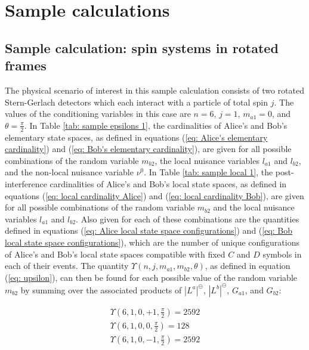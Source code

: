 \documentclass{article}
\begin{document}
\section{Sample calculations \label{sec: Sample calculations}}
\subsection{Sample calculation: spin systems in rotated frames \label{sec: sample rotated}}

The physical scenario of interest in this sample calculation consists of two rotated Stern-Gerlach detectors which each interact with a particle of total spin $j$. The values of the conditioning variables in this case are $n=6$, $j=1$, $m_{a1}=0$, and $\theta=\frac{\pi}{2}$. In Table \ref{tab: sample epsilons 1}, the cardinalities of Alice's and Bob's elementary state spaces, as defined in equations (\ref{eq: Alice's elementary cardinality}) and (\ref{eq: Bob's elementary cardinality}), are given for all possible combinations of the random variable $m_{b2}$, the local nuisance variables $l_{a1}$ and $l_{b2}$, and the non-local nuisance variable $\nu^0$. In Table \ref{tab: sample local 1}, the post-interference cardinalities of Alice's and Bob's local state spaces, as defined in equations (\ref{eq: local cardinality Alice}) and (\ref{eq: local cardinality Bob}), are given for all possible combinations of the random variable $m_{b2}$ and the local nuisance variables $l_{a1}$ and $l_{b2}$. Also given for each of these combinations are the quantities defined in equations (\ref{eq: Alice local state space configurations}) and (\ref{eq: Bob local state space configurations}), which are the number of unique configurations of Alice's and Bob's local state spaces compatible with fixed $C$ and $D$ symbols in each of their events. The quantity $\Upsilon(n,j,m_{a1},m_{b2},\theta)$, as defined in equation (\ref{eq: upsilon}), can then be found for each possible value of the random variable $m_{b2}$ by summing over the associated products of $|L^a|^\circleddash$, $|L^b|^\circleddash$, $G_{a1}$, and $G_{b2}$:

\begin{equation}
\begin{array}{ll}
    \Upsilon(6,1,0,+1,\frac{\pi}{2})=2592\\
    \Upsilon(6,1,0,0,\frac{\pi}{2})=128\\
    \Upsilon(6,1,0,-1,\frac{\pi}{2})=2592
\end{array}
\end{equation}
\end{document}

